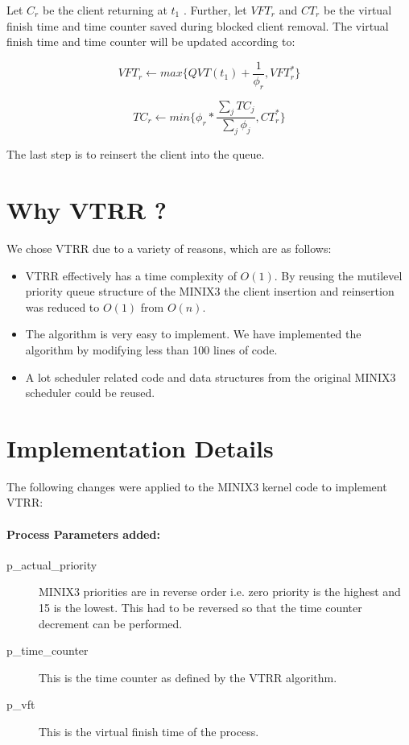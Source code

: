 Let $C_r$ be the client returning at $t_1$ . Further, let $VFT_r$ and $CT_r$ be the virtual finish time
and time counter saved during blocked client removal. The virtual finish time and time counter will be updated according to:

\begin{equation}
  VFT_r \leftarrow max\bigg\{QVT(t_1) + \frac{1}{\phi_r}, VFT^*_r\bigg\}
\end{equation}                             

\begin{equation}
  TC_r \leftarrow min\bigg\{\phi_r*\frac{\sum_jTC_j}{\sum_j\phi_j}, CT^*_r\bigg\}
\end{equation}

The last step is to reinsert the client into the queue.


\section{Why VTRR ?}

We chose VTRR due to a variety of reasons, which are as follows:

\begin{itemize}

\item VTRR effectively has a time complexity of $O(1)$. By reusing the mutilevel priority
  queue structure of the MINIX3 the client insertion and reinsertion was reduced to $O(1)$
  from $O(n)$.

\item The algorithm is very easy to implement. We have implemented the algorithm by modifying less than 
  100 lines of code.

\item A lot scheduler related code and data structures from the original MINIX3 scheduler could be
  reused.

\end{itemize}

\section{Implementation Details}

The following changes were applied to the MINIX3 kernel code to implement VTRR:

\paragraph{Process Parameters added:}
\begin{description}

\item[p\_actual\_priority] MINIX3 priorities are in reverse order i.e. zero priority is the highest
  and 15 is the lowest. This had to be reversed so that the time counter decrement can be performed.

\item[p\_time\_counter] This is the time counter as defined by the VTRR algorithm.

\item[p\_vft] This is the virtual finish time of the process.

\end{description} 

